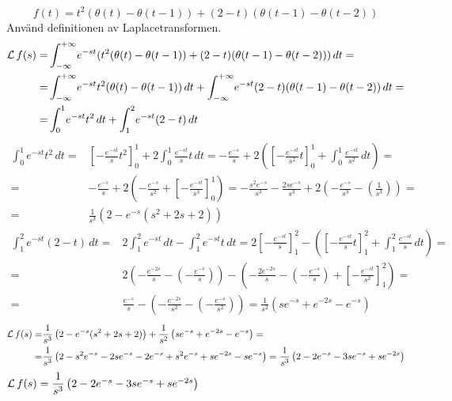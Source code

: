 \begin{task}{3.16}
	\[f(t)= t^2(\theta(t)-\theta(t-1))+(2-t)(\theta(t-1)-\theta(t-2))\]
	Använd definitionen av Laplacetransformen.
	\begin{align*}
	\operatorname{\mathcal{L}} f(s)=
	&\int_{-\infty}^{+\infty}\! e^{-st}(t^2(\theta(t)-\theta(t-1))+(2-t)(\theta(t-1)-\theta(t-2)))\, dt= \\ =
	&\int_{-\infty}^{+\infty}\! e^{-st}t^2(\theta(t)-\theta(t-1))\, dt+\int_{-\infty}^{+\infty}\! e^{-st}(2-t)(\theta(t-1)-\theta(t-2))\, dt= \\ =
	&\int_{0}^{1}\! e^{-st}t^2\, dt+\int_{1}^{2}\! e^{-st}(2-t)\, dt
	\end{align*}
	\begin{align*}
	\int_{0}^{1}\! e^{-st}t^2\, dt=
	&\left[-\frac{e^{-st}}{s}t^2\right]_0^1+2\int_{0}^{1}\! \frac{e^{-st}}{s}t\, dt=
	-\frac{e^{-s}}{s}+2\left(\left[-\frac{e^{-st}}{s^2}t\right]_0^1+\int_{0}^{1}\! \frac{e^{-st}}{s^2}\, dt\right)= \\ =
	&-\frac{e^{-s}}{s}+2\left(-\frac{e^{-s}}{s^2}+\left[-\frac{e^{-st}}{s^3}\right]_0^1\right)=
	-\frac{s^2e^{-s}}{s^3}-\frac{2se^{-s}}{s^3}+2\left(-\frac{e^{-s}}{s^3}-\left(\frac{1}{s^3}\right)\right)= \\ =
	&\frac{1}{s^3}\left(2-e^{-s}(s^2+2s+2)\right)
	\end{align*}
	\begin{align*}
	\int_{1}^{2}\! e^{-st}(2-t)\, dt=
	&2\int_{1}^{2}\! e^{-st}\, dt-\int_{1}^{2}\! e^{-st}t\, dt=
	2\left[-\frac{e^{-st}}{s}\right]_1^2-\left(\left[-\frac{e^{-st}}{s}t\right]_1^2+\int_{1}^{2}\! \frac{e^{-st}}{s}\, dt\right)= \\ =
	&2\left(-\frac{e^{-2s}}{s}-\left(-\frac{e^{-s}}{s}\right)\right)-\left(-\frac{2e^{-2s}}{s}-\left(-\frac{e^{-s}}{s}\right)+\left[-\frac{e^{-st}}{s^2}\right]_1^2\right)= \\ =
	&\frac{e^{-s}}{s}-\left(-\frac{e^{-2s}}{s^2}-\left(-\frac{e^{-s}}{s^2}\right)\right)=
	\frac{1}{s^2}\left(se^{-s}+e^{-2s}-e^{-s}\right)
	\end{align*}
	\begin{align*}
	\operatorname{\mathcal{L}} f(s)=
	&\frac{1}{s^3}\left(2-e^{-s}(s^2+2s+2)\right)+\frac{1}{s^2}\left(se^{-s}+e^{-2s}-e^{-s}\right)= \\ =
	&\frac{1}{s^3}\left(2-s^2e^{-s}-2se^{-s}-2e^{-s}+s^2e^{-s}+se^{-2s}-se^{-s}\right)=
	\frac{1}{s^3}\left(2-2e^{-s}-3se^{-s}+se^{-2s}\right)
	\end{align*}
	\ans $\operatorname{\mathcal{L}} f(s)=\dfrac{1}{s^3}\left(2-2e^{-s}-3se^{-s}+se^{-2s}\right)$
\end{task}